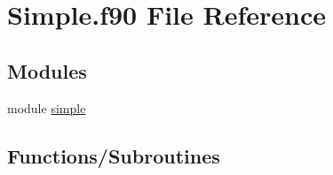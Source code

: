 \hypertarget{Simple_8f90}{}\section{Simple.\+f90 File Reference}
\label{Simple_8f90}
\subsection*{Modules}
\begin{DoxyCompactItemize}
\item 
module \hyperlink{namespacesimple}{simple}
\end{DoxyCompactItemize}
\subsection*{Functions/\+Subroutines}
